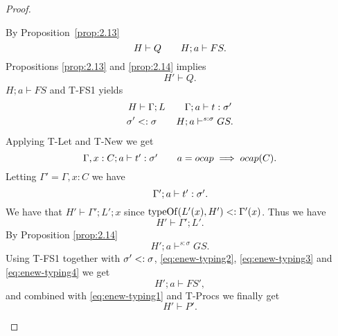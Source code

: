 \begin{proof}
\begin{description}
\begin{description}
\begin{description}
              By Proposition~\ref{prop:2.13}
              \begin{equation} 
                H \vdash Q \quad\quad H; a \vdash FS.
              \end{equation}
              Propositions \ref{prop:2.13} and \ref{prop:2.14} implies
              \begin{equation} \label{eq:enew-typing1}
                H' \vdash Q.
              \end{equation}
              $H;a \vdash FS$ and {\sc T-FS1} yields
              \begin{equation}
                \begin{gathered}
                  H \vdash \Gamma; L \quad\quad \mbox{$\Gamma;a\vdash t:\sigma'$}
                  \\
                  \sigma' <: \sigma \quad\quad H;a \vdash^{s: \sigma} GS.
                \end{gathered} 
              \end{equation}
              Applying {\sc T-Let} and {\sc T-New} we get
              \begin{equation} \label{eq:enew-typing5}
                \mbox{$\Gamma, x: C;a\vdash t':\sigma'$} \quad\quad a = \mbox{$ocap$}
                \implies \mbox{$ocap$}(C).
              \end{equation}
              Letting $\Gamma' = \Gamma, x: C$ we have
              \begin{equation} \label{eq:enew-typing2}
                \mbox{$\Gamma';a\vdash t':\sigma'$}.
              \end{equation}
              We have that $H' \vdash \Gamma';L';x$ since $\mbox{$\mathrm{typeOf}$}(L'(x), H')
              <: \Gamma'(x)$. Thus we have
              \begin{equation} \label{eq:enew-typing3}
                H' \vdash \Gamma'; L'.
              \end{equation}
              By Proposition \ref{prop:2.14}
              \begin{equation} \label{eq:enew-typing4}
                H';a \vdash^{s: \sigma} GS.
              \end{equation}
              Using {\sc T-FS1} together with $\sigma' <: \sigma$, \eqref{eq:enew-typing2},
              \eqref{eq:enew-typing3} and \eqref{eq:enew-typing4} we get
              \begin{equation}
                H';a \vdash FS',
              \end{equation}
              and combined with \eqref{eq:enew-typing1} and {\sc T-Procs} we finally
              get
              \begin{equation}
                H' \vdash P'.
              \end{equation}


\end{description}
\end{description}
\end{description}
\end{proof}

